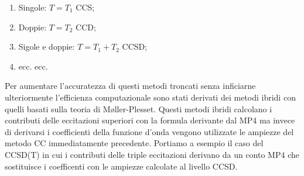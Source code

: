 \documentclass[oneside]{amsbook}
\numberwithin{section}{chapter}
\numberwithin{equation}{section}
\numberwithin{figure}{section}
\begin{document}
\begin{enumerate}
\item Singole: $T=T_1$ CCS;
\item Doppie: $ T= T_2$ CCD;
\item Sigole e doppie: $T= T_1+T_2$ CCSD;
\item ecc. ecc.
\end{enumerate}
Per aumentare l'accuratezza di questi metodi troncati senza inficiarne ulteriormente l'efficienza computazionale sono stati derivati dei metodi ibridi con quelli basati sulla teoria di M{\o}ller-Plesset. Questi metodi ibridi calcolano i contributi delle eccitazioni superiori con la formula derivante dal MP4 ma invece di derivarsi i coefficienti della funzione d'onda vengono utilizzate le ampiezze del metodo CC immediatamente precedente. Portiamo a esempio il caso del CCSD(T) in cui i contributi delle triple eccitazioni derivano da un conto MP4 che sostituisce i coefficenti con le ampiezze calcolate al livello CCSD. 
\end{document}
